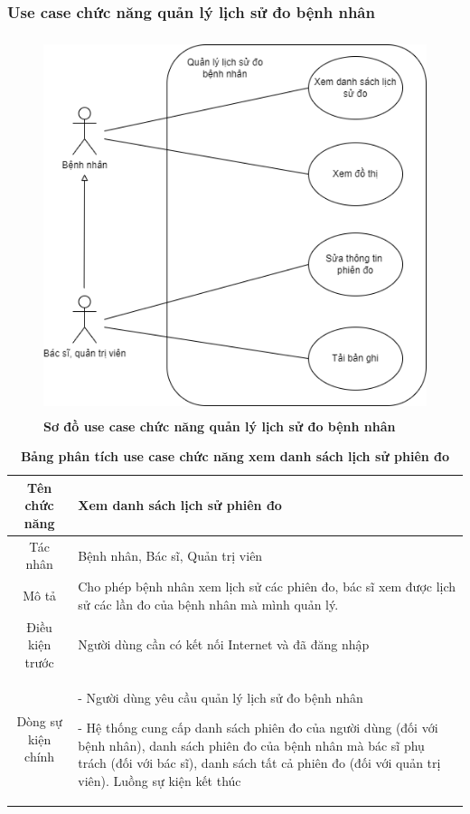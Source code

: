 \subsubsection{Use case chức năng quản lý lịch sử đo bệnh nhân}
  \begin{figure}[H]
    \centering
    \includegraphics[width=12cm,height=11cm]{Images/use_case/use_case_view_history_record.png}
    \caption[Sơ đồ use case chức năng quản lý lịch sử đo bệnh nhân]{\bfseries \fontsize{12pt}{0pt}
    \selectfont Sơ đồ use case chức năng quản lý lịch sử đo bệnh nhân}
    \label{use_case_view_history_record} %
  \end{figure}

  \begin{table}[H]
    \caption{\bfseries \fontsize{12pt}{0pt}\selectfont Bảng phân tích use case chức năng xem danh sách lịch sử phiên đo}
    \centering
    \begin{tabularx}{0.9\textwidth}{|c|X|}
      \hline
      \textbf{Tên chức năng} & \textbf{Xem danh sách lịch sử phiên đo} \\
      \hline
      Tác nhân & Bệnh nhân, Bác sĩ, Quản trị viên \\
      \hline
      Mô tả & Cho phép bệnh nhân xem lịch sử các phiên đo, bác sĩ xem được lịch sử các lần đo của bệnh nhân
      mà mình quản lý.\\
      \hline
      Điều kiện trước & Người dùng cần có kết nối Internet và đã đăng nhập \\
      \hline
      Dòng sự kiện chính & 
        - Người dùng yêu cầu quản lý lịch sử đo bệnh nhân

        - Hệ thống cung cấp danh sách phiên đo của người dùng (đối với bệnh nhân), danh sách phiên đo của 
        bệnh nhân mà bác sĩ phụ trách (đối với bác sĩ), danh sách tất cả phiên đo (đối với quản trị viên). Luồng sự kiện 
        kết thúc
        \\
      \hline
    \end{tabularx}
  \end{table}

